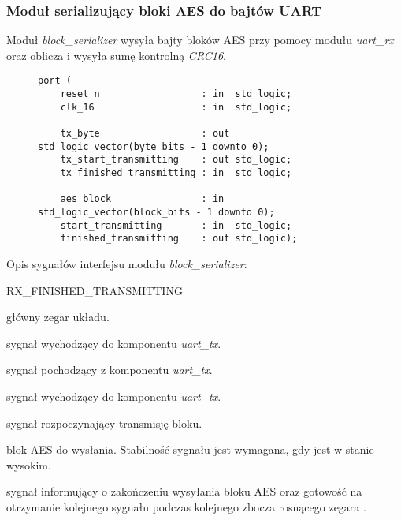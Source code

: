\subsubsection{Moduł serializujący bloki AES do bajtów UART}
Moduł \textit{block\_serializer} wysyła bajty bloków AES przy pomocy modułu \textit{uart\_rx} oraz oblicza i wysyła sumę kontrolną \textit{CRC16}.

\begin{figure}[!h]
\begin{lstlisting}[style=vhdl, captionpos=b, caption={\textit{block\_derializer} -- interfejs modułu}]
port (
	reset_n                  : in  std_logic;
	clk_16                   : in  std_logic;

	tx_byte                  : out std_logic_vector(byte_bits - 1 downto 0);
	tx_start_transmitting    : out std_logic;
	tx_finished_transmitting : in  std_logic;

	aes_block                : in  std_logic_vector(block_bits - 1 downto 0);
	start_transmitting       : in  std_logic;
	finished_transmitting    : out std_logic);
\end{lstlisting}
\end{figure}

Opis sygnałów interfejsu modułu \textit{block\_serializer}:
\begin{interface}{RX\_FINISHED\_TRANSMITTING}
	\item[\insignal{CLK\_16}] główny zegar układu.

	\item[\insignal{TX\_BYTE[7:0]}] sygnał wychodzący do komponentu \textit{uart\_tx}.
	\item[\outsignal{TX\_START\_TRANSMITTING}] sygnał pochodzący z komponentu \textit{uart\_tx}.
	\item[\insignal{TX\_FINISHED\_TRANSMITTING}] sygnał wychodzący do komponentu \textit{uart\_tx}.

	\item[\insignal{START\_TRANSMITTING}] sygnał rozpoczynający transmisję bloku.
	\item[\insignal{AES\_BLOCK[127:0]}] blok AES do wysłania. Stabilność sygnału jest wymagana, gdy  jest w stanie wysokim.
	\item[\outsignal{FINISHED\_TRANSMITTING}] sygnał informujący o zakończeniu wysyłania bloku AES oraz gotowość na otrzymanie kolejnego sygnału  podczas kolejnego zbocza rosnącego zegara .
\end{interface}

